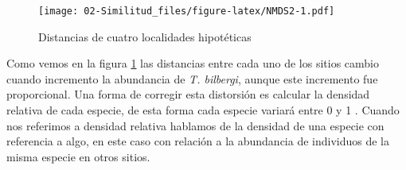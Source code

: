 \documentclass[
]{article}
\newenvironment{Shaded}{\begin{snugshade}}{\end{snugshade}}
\newcommand{\AttributeTok}[1]{\textcolor[rgb]{0.77,0.63,0.00}{#1}}
\newcommand{\DecValTok}[1]{\textcolor[rgb]{0.00,0.00,0.81}{#1}}
\newcommand{\FloatTok}[1]{\textcolor[rgb]{0.00,0.00,0.81}{#1}}
\newcommand{\FunctionTok}[1]{\textcolor[rgb]{0.00,0.00,0.00}{#1}}
\newcommand{\NormalTok}[1]{#1}
\newcommand{\OtherTok}[1]{\textcolor[rgb]{0.56,0.35,0.01}{#1}}
\newcommand{\SpecialCharTok}[1]{\textcolor[rgb]{0.00,0.00,0.00}{#1}}
\newcommand{\StringTok}[1]{\textcolor[rgb]{0.31,0.60,0.02}{#1}}
\begin{document}
\begin{Shaded}
\end{Shaded}

\begin{figure}
\centering
\texttt{[image: 02-Similitud\_files/figure-latex/NMDS2-1.pdf]}
\caption{\label{fig:NMDS2}Distancias de cuatro localidades hipotéticas}
\end{figure}

Como vemos en la figura \ref{fig:NMDS2} las distancias entre cada uno de los sitios cambio cuando incremento la abundancia de \emph{T. bilbergi}, aunque este incremento fue proporcional. Una forma de corregir esta distorsión es calcular la densidad relativa de cada especie, de esta forma cada especie variará entre 0 y 1 \citep{Stevens2009}. Cuando nos referimos a densidad relativa hablamos de la densidad de una especie con referencia a algo, en este caso con relación a la abundancia de individuos de la misma especie en otros sitios.
\end{document}
